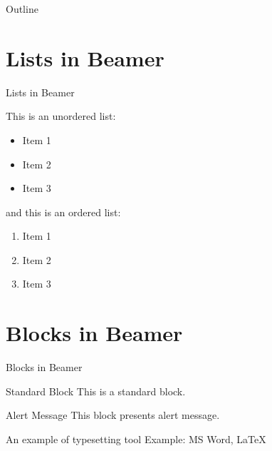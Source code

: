 \documentclass[aspectratio=169]{beamer}
\begin{document}
\begin{frame}{Outline}
    \tableofcontents

\end{frame}


\section{Lists in Beamer}
\begin{frame}{Lists in Beamer}

This is an unordered list:
\begin{itemize}
    \item Item 1
    \item Item 2
    \item Item 3
\end{itemize}

and this is an ordered list:
\begin{enumerate}
    \item Item 1
    \item Item 2
    \item Item 3
\end{enumerate}

\end{frame}


\section{Blocks in Beamer}
\begin{frame}{Blocks in Beamer}
    \begin{block}{Standard Block}
        This is a standard block.
    \end{block}
    \begin{alertblock}{Alert Message}
        This block presents alert message.
    \end{alertblock}
    \begin{exampleblock}{An example of typesetting tool}
        Example: MS Word, \LaTeX{}
    \end{exampleblock}
\end{frame} 


\end{document}
